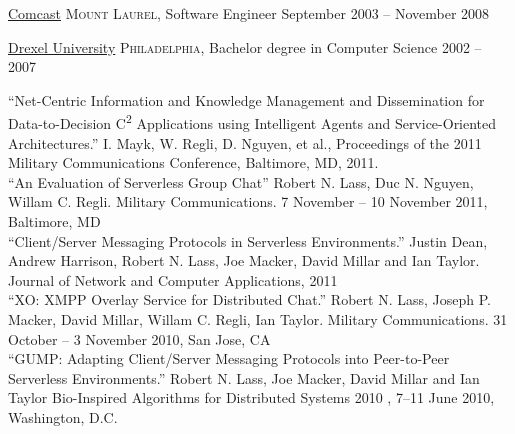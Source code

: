 \documentclass[10pt,a4paper]{article}
\begin{document}
\headedsection
  {\href{http://www.comcast.com/}{Comcast}}
  {\textsc{Mount Laurel, }} {%
  \headedsubsection
    {Software Engineer}
    {September 2003 -- November 2008}
    {}
}

\vspace{0.5em}
\spacedhrule{0.5em}{-0.4em}

\headedsection
  {\href{http://www.drexel.edu}{Drexel University}}
  {\textsc{Philadelphia, }} {%
  \headedsubsection
    {Bachelor degree in Computer Science}
    {2002 -- 2007}
    {}
}
\spacedhrule{0.5em}{-0.4em}



\vspace{0.3em}

\noindent ``Net-Centric Information and Knowledge Management and Dissemination for Data-to-Decision C\textsuperscript{2} Applications using Intelligent Agents and Service-Oriented Architectures.'' I. Mayk, W. Regli, D. Nguyen, et al.,  Proceedings of the 2011 Military Communications Conference, Baltimore, MD, 2011. \\

\noindent ``An Evaluation of Serverless Group Chat'' Robert N. Lass, Duc N. Nguyen,  Willam C. Regli. Military Communications. 7 November -- 10 November 2011, Baltimore, MD \\

\noindent ``Client/Server Messaging Protocols in Serverless Environments.'' Justin Dean, Andrew Harrison, Robert N. Lass, Joe Macker, David Millar and Ian Taylor. Journal of Network and Computer Applications, 2011 \\

\noindent ``XO: XMPP Overlay Service for Distributed Chat.'' Robert N. Lass, Joseph P. Macker, David Millar, Willam C. Regli, Ian Taylor. Military Communications. 31 October -- 3 November 2010, San Jose, CA \\

\noindent ``GUMP: Adapting Client/Server Messaging Protocols into Peer-to-Peer Serverless Environments.'' Robert N. Lass, Joe Macker, David Millar and Ian Taylor Bio-Inspired Algorithms for Distributed Systems 2010 , 7--11 June 2010, Washington, D.C. \\
\end{document}
